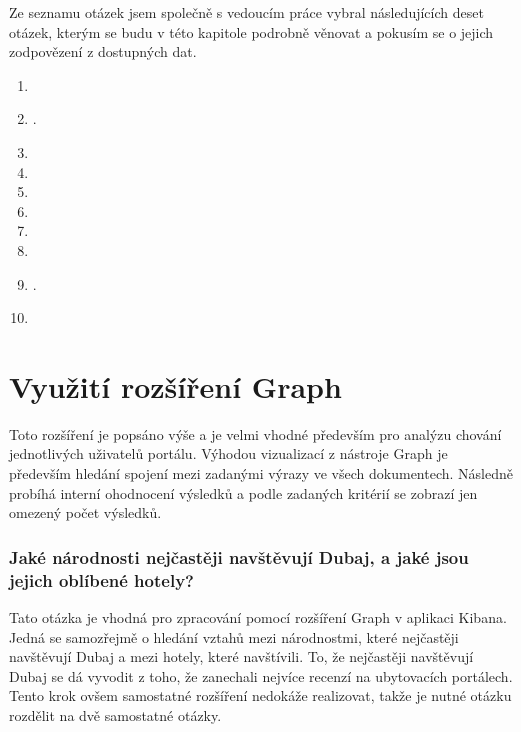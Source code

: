 \documentclass[czech,BP]{thesiskiv}
\begin{document}
Ze seznamu otázek jsem společně s vedoucím práce vybral následujících deset otázek, kterým se budu v této kapitole podrobně věnovat a pokusím se o jejich zodpovězení z dostupných dat.
\begin{enumerate}
	\item {}
	\item {}.
	\item {}
	\item {}
	\item {}
	\item {}
	\item {}
	\item {}
	\item {}.
	\item {}
\end{enumerate}


\section{Využití rozšíření Graph}
Toto rozšíření je popsáno výše a je velmi vhodné především pro analýzu chování jednotlivých uživatelů portálu. Výhodou vizualizací z nástroje Graph je především hledání spojení mezi zadanými výrazy ve všech dokumentech. Následně probíhá interní ohodnocení výsledků a podle zadaných kritérií se zobrazí jen omezený počet výsledků.

\subsubsection{Jaké národnosti nejčastěji navštěvují Dubaj, a jaké jsou jejich oblíbené hotely?}
\label{subsub:Národnosti}
Tato otázka je vhodná pro zpracování pomocí rozšíření Graph v aplikaci Kibana. Jedná se samozřejmě o hledání vztahů mezi národnostmi, které nejčastěji navštěvují Dubaj a mezi hotely, které navštívili. To, že nejčastěji navštěvují Dubaj se dá vyvodit z toho, že zanechali nejvíce recenzí na ubytovacích portálech. Tento krok ovšem samostatné rozšíření nedokáže realizovat, takže je nutné otázku rozdělit na dvě samostatné otázky.
\end{document}
